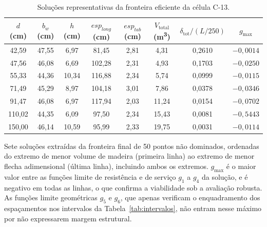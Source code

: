 \begin{table}[!ht]
\caption{Soluções representativas da fronteira eficiente da célula C-13.\label{tab:solucoes_ref}}
\begin{threeparttable}
\setlength{\tabcolsep}{3pt}
\begin{tabular*}{\textwidth}{@{\extracolsep{\fill}}cccccccc@{\extracolsep{\fill}}}
\toprule
$d$ (cm) & $b_w$ (cm) & $h$ (cm) & $esp_{long}$ (cm) & $esp_{tab}$ (cm) & $V_{\mathrm{total}}$ (m\textsuperscript{3}) & $\delta_{\mathrm{tot}}/(L/250)$ & $g_{\max}$ \\
\midrule
42{,}59 & 47{,}55 & 6{,}97 & 81{,}45 & 2{,}81 & 4{,}31 & 0{,}2610 & $-0{,}0014$ \\
47{,}56 & 46{,}08 & 6{,}69 & 102{,}28 & 2{,}31 & 4{,}93 & 0{,}1703 & $-0{,}0250$ \\
55{,}33 & 44{,}36 & 10{,}34 & 116{,}88 & 2{,}34 & 5{,}74 & 0{,}0999 & $-0{,}0115$ \\
71{,}49 & 45{,}29 & 8{,}97 & 104{,}18 & 3{,}01 & 7{,}86 & 0{,}0378 & $-0{,}0346$ \\
91{,}47 & 46{,}08 & 6{,}97 & 117{,}94 & 2{,}03 & 11{,}24 & 0{,}0154 & $-0{,}0702$ \\
110{,}02 & 44{,}35 & 6{,}09 & 97{,}50 & 2{,}34 & 15{,}43 & 0{,}0081 & $-0{,}5443$ \\
150{,}00 & 46{,}14 & 10{,}59 & 95{,}99 & 2{,}33 & 19{,}75 & 0{,}0031 & $-0{,}0114$ \\
\bottomrule
\end{tabular*}
\begin{tablenotes}
\footnotesize
\item Sete soluções extraídas da fronteira final de 50 pontos não dominados, ordenadas do extremo de menor volume de madeira (primeira linha) ao extremo de menor flecha adimensional (última linha), incluindo ambos os extremos. $g_{\max}$ é o maior valor entre as funções limite de resistência e de serviço $g_1$ a $g_4$ da solução, e é negativo em todas as linhas, o que confirma a viabilidade sob a avaliação robusta.
As funções limite geométricas $g_5$ e $g_6$, que apenas verificam o enquadramento dos espaçamentos nos intervalos da Tabela~\ref{tab:intervalos}, não entram nesse máximo por não expressarem margem estrutural.
\end{tablenotes}
\end{threeparttable}
\end{table}

